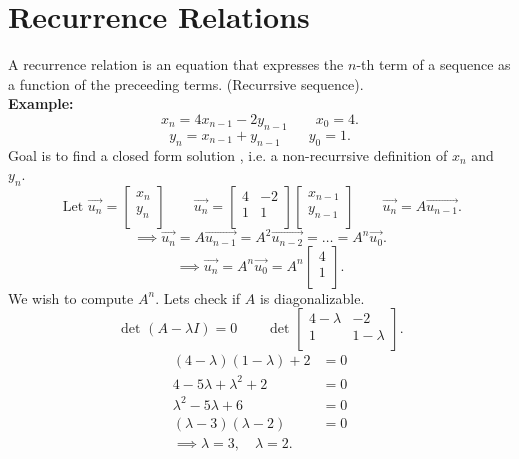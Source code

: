 \documentclass{report}
\begin{document}
   \section{Recurrence Relations}
   A recurrence relation is an equation that expresses the $ n$-th term of a sequence as a function of the preceeding terms. (Recurrsive sequence).\\
   	\textbf{Example:} 
	\[
	x_n = 4 x_{n-1} -2 y _{n-1}  \qquad  x_0 = 4
	.\] 
	\[
	y_n = x_{n-1} + y_{n-1} \qquad y_0 = 1
	.\] 
	Goal is to find a closed form solution , i.e.  a non-recurrsive definition of  $ x_n$ and $ y_n$.\\
	\[
	\text{ Let } \vec{ u_n} = \begin{bmatrix}
	x_n\\
	y_n\\
	\end{bmatrix}
	 \qquad  \vec{ u_n} = \begin{bmatrix}
	 4 & -2\\
	 1 & 1\\
	 \end{bmatrix} \begin{bmatrix}
	 x_{n-1}\\
	 y_{n-1}\\
	 \end{bmatrix}
	       \qquad  \vec{ u_n} = A \vec{ u_{n-1}}
	.\] 
	\[
	\implies \vec{ u_n} = A \vec{ u_{n-1}} = A ^2 \vec{ u_{n-2}} = \ldots = A ^n \vec{ u_0}
	.\] 
	\[
	\implies \vec{ u_n} = A ^n \vec{ u_0} = A ^n \begin{bmatrix}
	4\\
	1\\
	\end{bmatrix}
	.\] 
         We wish to compute $ A^{n}$. Lets check if $ A$ is diagonalizable.\\
	 \[
	 \text{ det }  \left( A - \lambda I \right) =0 \qquad  \text{ det } \begin{bmatrix}
	 4-\lambda & -2\\
	 1 & 1-\lambda\\
	 \end{bmatrix}
	 .\] 
	 \begin{align*}
	 	\left( 4-\lambda \right) \left( 1-\lambda  \right) +2 & = 0\\
		4 -5\lambda + \lambda ^2 +2 & = 0\\
		\lambda ^2 -5 \lambda +6 & = 0\\
		\left( \lambda-3 \right) \left( \lambda -2 \right) &=0\\
		\implies \lambda =3 , \quad \lambda =2
	 .\end{align*}
\end{document}

